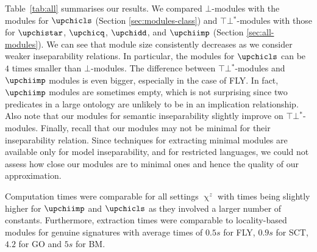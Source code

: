 Table~\ref{tab:all} 
summarises our results.
We compared $\bot$-modules with the modules for
$\upchicls$ (Section \ref{sec:modules-class})
and $\top\!\bot\!^*$-modules with those for $\upchistar$, $\upchicq$, $\upchidd$, and
$\upchiimp$ (Section \ref{sec:all-modules}).
We can see that module size consistently decreases as
we consider weaker inseparability relations. 
In particular, the modules 
for $\upchicls$ can be $4$ times smaller than $\bot$-modules.
% 
% 
The difference between $\top\!\bot\!^*$-modules and $\upchiimp$ modules is even bigger, 
especially in the case of FLY. In fact, $\upchiimp$ modules
are sometimes empty, which is not surprising since two predicates in a large
ontology are unlikely to be in an implication relationship.
% 
% 
Also note that
our modules for semantic inseparability slightly improve on
$\top\!\bot\!^*$-modules.
Finally, recall that our modules may not be
minimal for their inseparability relation. Since
techniques for extracting minimal modules
are available only for model inseparability, and for 
restricted languages,
we could not assess how close our modules are
to minimal ones and hence the quality of our approximation.




Computation times were comparable for all settings $\upchi^z$ with
times being slightly higher for $\upchiimp$ and $\upchicls$ as they
involved a larger number of constants.  Furthermore, extraction times
were comparable to locality-based modules for genuine signatures with
average times of $0.5s$ for FLY, $0.9s$ for SCT, $4.2$ for GO and $5s$
for BM.





